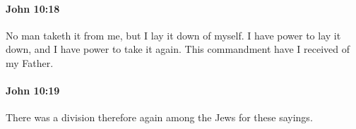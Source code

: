 		\paragraph{John 10:18} %
			\label{JOHN-10-18}

			No man taketh it from me, but I lay it down of myself. I have power to lay it down, and I have power to take it again. This commandment have I received of my Father.

			\begin{framed}
				\scriptsize
				\begin{compactdesc}
					\item[SBLG]  \hyperref[EXOUSIA]{}  \hyperref[EXOUSIA]{} 
				\end{compactdesc}
			\end{framed}

		\paragraph{John 10:19} %
			\label{JOHN-10-19}

			There was a division therefore again among the Jews for these sayings.

